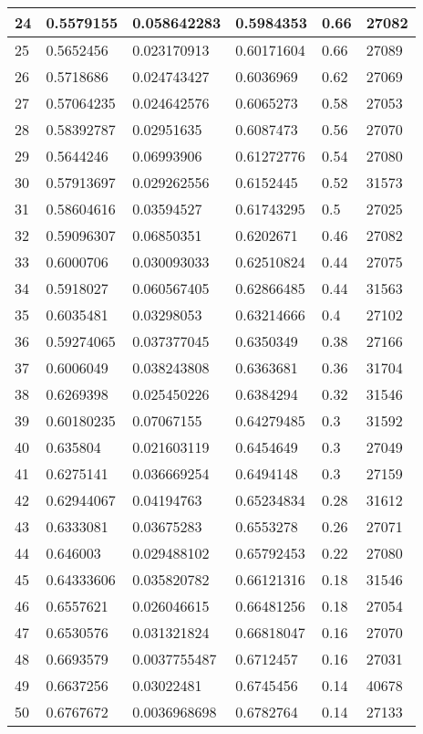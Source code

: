\begin{longtable}{|l|l|l|l|l|l|}
24 & 0.5579155 & 0.058642283 & 0.5984353 & 0.66 & 27082 \\ \hline 
25 & 0.5652456 & 0.023170913 & 0.60171604 & 0.66 & 27089 \\ \hline 
26 & 0.5718686 & 0.024743427 & 0.6036969 & 0.62 & 27069 \\ \hline 
27 & 0.57064235 & 0.024642576 & 0.6065273 & 0.58 & 27053 \\ \hline 
28 & 0.58392787 & 0.02951635 & 0.6087473 & 0.56 & 27070 \\ \hline 
29 & 0.5644246 & 0.06993906 & 0.61272776 & 0.54 & 27080 \\ \hline 
30 & 0.57913697 & 0.029262556 & 0.6152445 & 0.52 & 31573 \\ \hline 
31 & 0.58604616 & 0.03594527 & 0.61743295 & 0.5 & 27025 \\ \hline 
32 & 0.59096307 & 0.06850351 & 0.6202671 & 0.46 & 27082 \\ \hline 
33 & 0.6000706 & 0.030093033 & 0.62510824 & 0.44 & 27075 \\ \hline 
34 & 0.5918027 & 0.060567405 & 0.62866485 & 0.44 & 31563 \\ \hline 
35 & 0.6035481 & 0.03298053 & 0.63214666 & 0.4 & 27102 \\ \hline 
36 & 0.59274065 & 0.037377045 & 0.6350349 & 0.38 & 27166 \\ \hline 
37 & 0.6006049 & 0.038243808 & 0.6363681 & 0.36 & 31704 \\ \hline 
38 & 0.6269398 & 0.025450226 & 0.6384294 & 0.32 & 31546 \\ \hline 
39 & 0.60180235 & 0.07067155 & 0.64279485 & 0.3 & 31592 \\ \hline 
40 & 0.635804 & 0.021603119 & 0.6454649 & 0.3 & 27049 \\ \hline 
41 & 0.6275141 & 0.036669254 & 0.6494148 & 0.3 & 27159 \\ \hline 
42 & 0.62944067 & 0.04194763 & 0.65234834 & 0.28 & 31612 \\ \hline 
43 & 0.6333081 & 0.03675283 & 0.6553278 & 0.26 & 27071 \\ \hline 
44 & 0.646003 & 0.029488102 & 0.65792453 & 0.22 & 27080 \\ \hline 
45 & 0.64333606 & 0.035820782 & 0.66121316 & 0.18 & 31546 \\ \hline 
46 & 0.6557621 & 0.026046615 & 0.66481256 & 0.18 & 27054 \\ \hline 
47 & 0.6530576 & 0.031321824 & 0.66818047 & 0.16 & 27070 \\ \hline 
48 & 0.6693579 & 0.0037755487 & 0.6712457 & 0.16 & 27031 \\ \hline 
49 & 0.6637256 & 0.03022481 & 0.6745456 & 0.14 & 40678 \\ \hline 
50 & 0.6767672 & 0.0036968698 & 0.6782764 & 0.14 & 27133 \\ \hline 
\end{longtable}